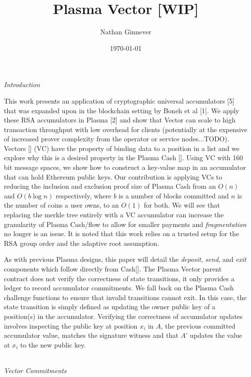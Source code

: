 \documentclass[11pt]{article}
\title{Plasma Vector [WIP]}
\author{Nathan Ginnever}
\date{\today}
\begin{document}
\maketitle
\centerline{\textit{Introduction}}

This work presents an application of cryptographic universal accumulators [5] that was expanded upon in the blockchain setting by Boneh et al [1]. We apply these RSA accumulators in Plasma [2] and show that Vector can scale to high transaction throughput with low overhead for clients (potentially at the expensive of increased prover complexity from the operator or service nodes...TODO). Vectors [] (VC) have the property of binding data to a position in a list and we explore why this is a desired property in the Plasma Cash []. Using VC with 160 bit message spaces, we show how to construct a key-value map in an accumulator that can hold Ethereum public keys. Our contribution is applying VCs to reducing the inclusion and exclusion proof size of Plasma Cash from an $O(n)$ and $O(b \log n)$ respectively, where $b$ is a number of blocks committed and $n$ is the number of coins a user owns, to an $O(1)$ for both. We will see that replacing the merkle tree entirely with a VC accumulator can increase the granularity of Plasma Cash/flow to allow for smaller payments and \textit{fragmentation} no longer is an issue. It is noted that this work relies on a trusted setup for the RSA group order and the adaptive root assumption. 

As with previous Plasma designs, this paper will detail the \textit{deposit}, \textit{send}, and \textit{exit} components which follow directly from Cash[]. The Plasma Vector parent contract does not verify the correctness of state transitions, it only provides a ledger to record accumulator commitments. We fall back on the Plasma Cash challenge functions to ensure that invalid transitions cannot exit. In this case, the state transition is simply defined as updating the owner public key of a position(s) in the accumulator. Verifying the correctness of accumulator updates involves inspecting the public key at position $x_i$ in $A$, the previous committed accumulator value, matches the signature witness and that $A’$ updates the value at $x_i$ to the new public key. 
\\
\\

\centerline{\textit{Vector Commitments}}
\end{document}
